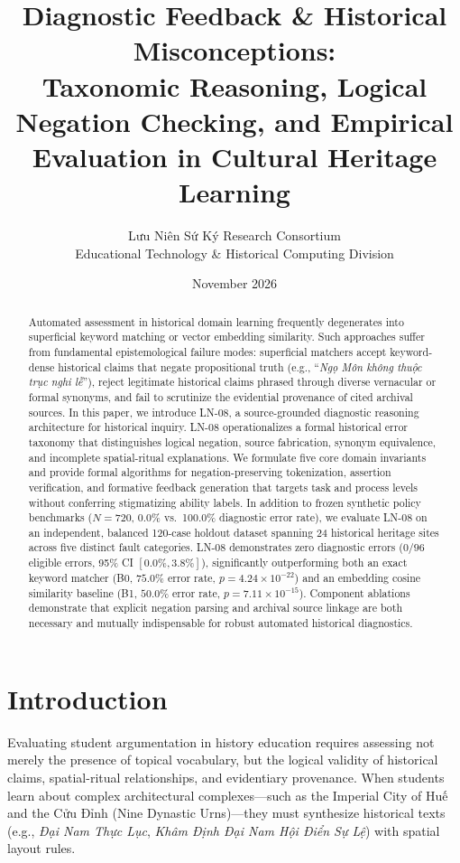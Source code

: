 \documentclass[11pt,a4paper]{article}
\title{Diagnostic Feedback \& Historical Misconceptions: \\ \large Taxonomic Reasoning, Logical Negation Checking, and Empirical Evaluation in Cultural Heritage Learning}
\author{Lưu Niên Sứ Ký Research Consortium \\ \small Educational Technology \& Historical Computing Division}
\date{November 2026}
\begin{document}
\maketitle

\begin{abstract}
Automated assessment in historical domain learning frequently degenerates into superficial keyword matching or vector embedding similarity. Such approaches suffer from fundamental epistemological failure modes: superficial matchers accept keyword-dense historical claims that negate propositional truth (e.g., ``\textit{Ngọ Môn không thuộc trục nghi lễ}''), reject legitimate historical claims phrased through diverse vernacular or formal synonyms, and fail to scrutinize the evidential provenance of cited archival sources. In this paper, we introduce LN-08, a source-grounded diagnostic reasoning architecture for historical inquiry. LN-08 operationalizes a formal historical error taxonomy that distinguishes logical negation, source fabrication, synonym equivalence, and incomplete spatial-ritual explanations. We formulate five core domain invariants and provide formal algorithms for negation-preserving tokenization, assertion verification, and formative feedback generation that targets task and process levels without conferring stigmatizing ability labels. In addition to frozen synthetic policy benchmarks ($N=720$, 0.0\% vs.\ 100.0\% diagnostic error rate), we evaluate LN-08 on an independent, balanced 120-case holdout dataset spanning 24 historical heritage sites across five distinct fault categories. LN-08 demonstrates zero diagnostic errors ($0/96$ eligible errors, 95\% CI $[0.0\%, 3.8\%]$), significantly outperforming both an exact keyword matcher (B0, $75.0\%$ error rate, $p = 4.24 \times 10^{-22}$) and an embedding cosine similarity baseline (B1, $50.0\%$ error rate, $p = 7.11 \times 10^{-15}$). Component ablations demonstrate that explicit negation parsing and archival source linkage are both necessary and mutually indispensable for robust automated historical diagnostics.
\end{abstract}

\section{Introduction}
Evaluating student argumentation in history education requires assessing not merely the presence of topical vocabulary, but the logical validity of historical claims, spatial-ritual relationships, and evidentiary provenance. When students learn about complex architectural complexes—such as the Imperial City of Huế and the Cửu Đỉnh (Nine Dynastic Urns)—they must synthesize historical texts (e.g., \textit{Đại Nam Thực Lục}, \textit{Khâm Định Đại Nam Hội Điển Sự Lệ}) with spatial layout rules.
\end{document}
